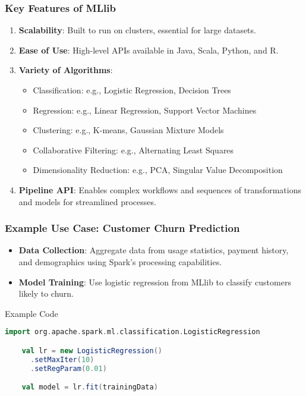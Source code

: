 \documentclass[aspectratio=169]{beamer}
\begin{document}
\begin{frame}[fragile]
    \frametitle{Key Features of MLlib}
    \begin{enumerate}
        \item \textbf{Scalability}: Built to run on clusters, essential for large datasets.
        \item \textbf{Ease of Use}: High-level APIs available in Java, Scala, Python, and R.
        \item \textbf{Variety of Algorithms}: 
        \begin{itemize}
            \item Classification: e.g., Logistic Regression, Decision Trees
            \item Regression: e.g., Linear Regression, Support Vector Machines
            \item Clustering: e.g., K-means, Gaussian Mixture Models
            \item Collaborative Filtering: e.g., Alternating Least Squares
            \item Dimensionality Reduction: e.g., PCA, Singular Value Decomposition
        \end{itemize}
        \item \textbf{Pipeline API}: Enables complex workflows and sequences of transformations and models for streamlined processes.
    \end{enumerate}
\end{frame}

\begin{frame}[fragile]
    \frametitle{Example Use Case: Customer Churn Prediction}
    \begin{itemize}
        \item \textbf{Data Collection}: Aggregate data from usage statistics, payment history, and demographics using Spark's processing capabilities.
        \item \textbf{Model Training}: Use logistic regression from MLlib to classify customers likely to churn.
    \end{itemize}
    
    \begin{block}{Example Code}
    \begin{lstlisting}[language=Scala]
    import org.apache.spark.ml.classification.LogisticRegression

    val lr = new LogisticRegression()
      .setMaxIter(10)
      .setRegParam(0.01)

    val model = lr.fit(trainingData)
    \end{lstlisting}
    \end{block}
\end{frame}
\end{document}
